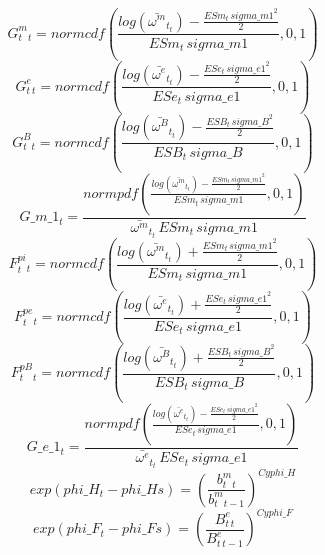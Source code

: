 \begin{dmath}
{ G^m_t _{t}}=normcdf(\frac{log\left({ \bar{\omega^m}_t _{t}}\right)-\frac{{ESm_{t}}\, {sigma\_m1}^{2}}{2}}{{ESm_{t}}\, {sigma\_m1}},0,1)
\end{dmath}
\begin{dmath}
{ G^e_t _{t}}=normcdf(\frac{log\left({ \bar{\omega^e}_t _{t}}\right)-\frac{{ESe_{t}}\, {sigma\_e1}^{2}}{2}}{{ESe_{t}}\, {sigma\_e1}},0,1)
\end{dmath}
\begin{dmath}
{ G^B_t _{t}}=normcdf(\frac{log\left({ \bar{\omega^B}_t _{t}}\right)-\frac{{ESB_{t}}\, {sigma\_B}^{2}}{2}}{{ESB_{t}}\, {sigma\_B}},0,1)
\end{dmath}
\begin{dmath}
{G\_m\_1_{t}}=\frac{normpdf(\frac{log\left({ \bar{\omega^m}_t _{t}}\right)-\frac{{ESm_{t}}\, {sigma\_m1}^{2}}{2}}{{ESm_{t}}\, {sigma\_m1}},0,1)}{{ \bar{\omega^m}_t _{t}}\, {ESm_{t}}\, {sigma\_m1}}
\end{dmath}
\begin{dmath}
{ F^{pi}_t _{t}}=normcdf(\frac{log\left({ \bar{\omega^m}_t _{t}}\right)+\frac{{ESm_{t}}\, {sigma\_m1}^{2}}{2}}{{ESm_{t}}\, {sigma\_m1}},0,1)
\end{dmath}
\begin{dmath}
{ F^{pe}_t _{t}}=normcdf(\frac{log\left({ \bar{\omega^e}_t _{t}}\right)+\frac{{ESe_{t}}\, {sigma\_e1}^{2}}{2}}{{ESe_{t}}\, {sigma\_e1}},0,1)
\end{dmath}
\begin{dmath}
{ F^{pB}_t _{t}}=normcdf(\frac{log\left({ \bar{\omega^B}_t _{t}}\right)+\frac{{ESB_{t}}\, {sigma\_B}^{2}}{2}}{{ESB_{t}}\, {sigma\_B}},0,1)
\end{dmath}
\begin{dmath}
{G\_e\_1_{t}}=\frac{normpdf(\frac{log\left({ \bar{\omega^e}_t _{t}}\right)-\frac{{ESe_{t}}\, {sigma\_e1}^{2}}{2}}{{ESe_{t}}\, {sigma\_e1}},0,1)}{{ \bar{\omega^e}_t _{t}}\, {ESe_{t}}\, {sigma\_e1}}
\end{dmath}
\begin{dmath}
exp\left({phi\_H_{t}}-{phi\_Hs}\right)=\left(\frac{{ b^m_t _{t}}}{{ b^m_t _{t-1}}}\right)^{{Cyphi\_H}}
\end{dmath}
\begin{dmath}
exp\left({phi\_F_{t}}-{phi\_Fs}\right)=\left(\frac{{B^e_t_{t}}}{{B^e_t_{t-1}}}\right)^{{Cyphi\_F}}
\end{dmath}
